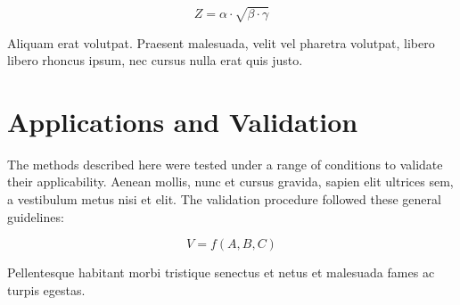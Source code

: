 \begin{equation}\label{eq: dummy_output}
    Z = \alpha \cdot \sqrt{\beta \cdot \gamma}
\end{equation}

Aliquam erat volutpat. Praesent malesuada, velit vel pharetra volutpat, libero libero rhoncus ipsum, nec cursus nulla erat quis justo.


\section{Applications and Validation}
The methods described here were tested under a range of conditions to validate their applicability. Aenean mollis, nunc et cursus gravida, sapien elit ultrices sem, a vestibulum metus nisi et elit. The validation procedure followed these general guidelines:

\begin{equation}\label{eq: dummy_validation}
    V = f(A, B, C)
\end{equation}

Pellentesque habitant morbi tristique senectus et netus et malesuada fames ac turpis egestas.
